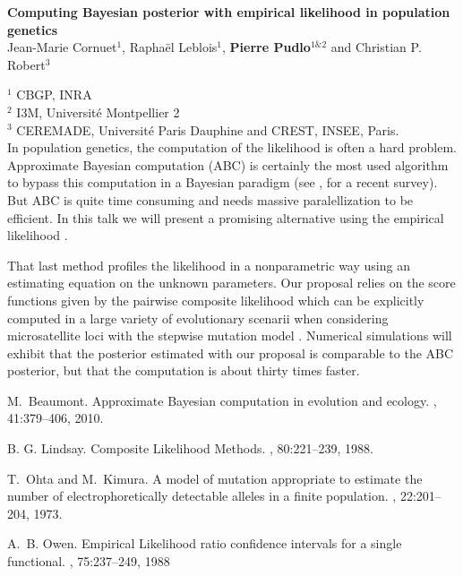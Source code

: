 \documentclass[11pt,a4paper]{article}
\theoremstyle{remark}
\theoremstyle{definition}
\begin{document}
%
\begin{center}
\textbf{\Large Computing Bayesian posterior with empirical likelihood in population genetics}\\[1em]
Jean-Marie Cornuet$^1$, Rapha{\"e}l Leblois$^1$, \textbf{Pierre Pudlo}$^{1 \& 2}$ and
Christian P. Robert$^3$ \\[1em]
\end{center}
$^1$ CBGP, INRA\\
$^2$ I3M, Universit\'e Montpellier 2\\
$^3$ CEREMADE, Universit\'e Paris Dauphine and CREST, INSEE, Paris.\\

In population genetics, the computation of the likelihood is often a hard problem. Approximate Bayesian
computation (ABC) is certainly the most used algorithm to bypass this computation in a Bayesian paradigm (see
\cite{beaumont10}, for a recent survey). But ABC is quite time consuming and needs massive paralellization to be
efficient. In this talk we will present a promising alternative using the empirical likelihood \cite{owen88}.


That last method profiles the likelihood in a nonparametric way using an estimating equation on the unknown
parameters. Our proposal relies on the score functions given by the pairwise composite likelihood 
\cite{lindsay88} which can be explicitly computed in a large variety of evolutionary scenarii when considering
microsatellite loci with the stepwise mutation model \cite{ohta:kimura:73}. Numerical simulations will
exhibit that the posterior estimated with our proposal is comparable to the ABC posterior, but that the
computation is about thirty times faster.



\begin{thebibliography}{1}
M.~Beaumont.
\newblock Approximate Bayesian computation in evolution and ecology.
, 41:379--406, 2010.

B. G. Lindsay.
\newblock Composite Likelihood Methods.
, 80:221--239, 1988.

T.~Ohta and M.~Kimura.
\newblock A model of mutation appropriate to estimate the number of electrophoretically detectable alleles in
a finite population.
, 22:201--204, 1973.

A.~B. Owen.
\newblock Empirical Likelihood ratio confidence intervals for a single functional.
, 75:237--249, 1988

\end{thebibliography}
% 
% 
\end{document}

